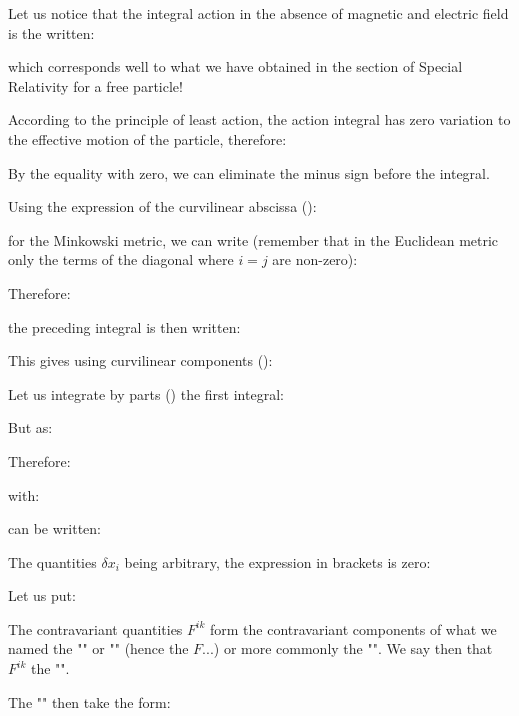 	Let us notice that the integral action in the absence of magnetic and electric field is the written:
	
	which corresponds well to what we have obtained in the section of Special Relativity for a free particle!

	According to the principle of least action, the action integral has zero variation to the effective motion of the particle, therefore:
	
	\begin{tcolorbox}[title=Remark,colframe=black,arc=10pt]
	By the equality with zero, we can eliminate the minus sign before the integral.
	\end{tcolorbox}
	Using the expression of the curvilinear abscissa ():
	
	for the Minkowski metric, we can write (remember that in the Euclidean metric only the terms of the diagonal where $i=j$ are non-zero):
	
	Therefore:
	
	the preceding integral is then written:
	
	This gives using curvilinear components ():
	
	Let us integrate by parts () the first integral:
	
	But as:
	
	Therefore:
	
	with:
	
	can be written:
	
	The quantities $\delta x_i$ being arbitrary, the expression in brackets is zero:
	
	Let us put:
	
	The contravariant quantities $F^{ik}$ form the contravariant components of what we named the "" or "" (hence the $F$...) or more commonly the "". We say then that $F^{ik}$ the "".

	The "\label{equations of motion of a particle in an electromagnetic field}" then take the form:
	
